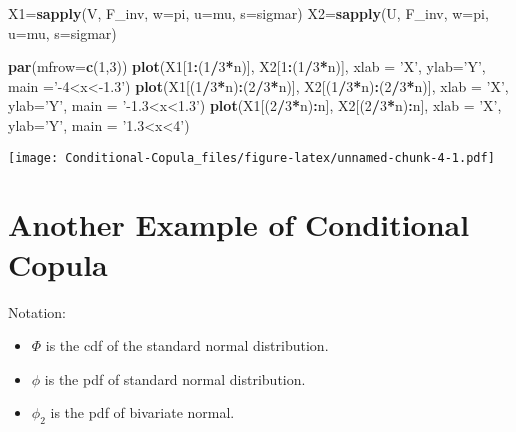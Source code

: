 \documentclass[]{article}
\newenvironment{Shaded}{\begin{snugshade}}{\end{snugshade}}
\newcommand{\KeywordTok}[1]{\textcolor[rgb]{0.13,0.29,0.53}{\textbf{#1}}}
\newcommand{\DataTypeTok}[1]{\textcolor[rgb]{0.13,0.29,0.53}{#1}}
\newcommand{\DecValTok}[1]{\textcolor[rgb]{0.00,0.00,0.81}{#1}}
\newcommand{\StringTok}[1]{\textcolor[rgb]{0.31,0.60,0.02}{#1}}
\newcommand{\OperatorTok}[1]{\textcolor[rgb]{0.81,0.36,0.00}{\textbf{#1}}}
\newcommand{\NormalTok}[1]{#1}
\providecommand{\tightlist}{%
  \setlength{\itemsep}{0pt}\setlength{\parskip}{0pt}}
\begin{document}
\begin{Shaded}
\begin{Highlighting}[]
\NormalTok{X1=}\KeywordTok{sapply}\NormalTok{(V, F_inv, }\DataTypeTok{w=}\NormalTok{pi, }\DataTypeTok{u=}\NormalTok{mu, }\DataTypeTok{s=}\NormalTok{sigmar)}
\NormalTok{X2=}\KeywordTok{sapply}\NormalTok{(U, F_inv, }\DataTypeTok{w=}\NormalTok{pi, }\DataTypeTok{u=}\NormalTok{mu, }\DataTypeTok{s=}\NormalTok{sigmar)}

\KeywordTok{par}\NormalTok{(}\DataTypeTok{mfrow=}\KeywordTok{c}\NormalTok{(}\DecValTok{1}\NormalTok{,}\DecValTok{3}\NormalTok{))}
\KeywordTok{plot}\NormalTok{(X1[}\DecValTok{1}\OperatorTok{:}\NormalTok{(}\DecValTok{1}\OperatorTok{/}\DecValTok{3}\OperatorTok{*}\NormalTok{n)], X2[}\DecValTok{1}\OperatorTok{:}\NormalTok{(}\DecValTok{1}\OperatorTok{/}\DecValTok{3}\OperatorTok{*}\NormalTok{n)],  }\DataTypeTok{xlab =} \StringTok{'X'}\NormalTok{, }\DataTypeTok{ylab=}\StringTok{'Y'}\NormalTok{, }\DataTypeTok{main =}\StringTok{'-4<x<-1.3'}\NormalTok{)}
\KeywordTok{plot}\NormalTok{(X1[(}\DecValTok{1}\OperatorTok{/}\DecValTok{3}\OperatorTok{*}\NormalTok{n)}\OperatorTok{:}\NormalTok{(}\DecValTok{2}\OperatorTok{/}\DecValTok{3}\OperatorTok{*}\NormalTok{n)], X2[(}\DecValTok{1}\OperatorTok{/}\DecValTok{3}\OperatorTok{*}\NormalTok{n)}\OperatorTok{:}\NormalTok{(}\DecValTok{2}\OperatorTok{/}\DecValTok{3}\OperatorTok{*}\NormalTok{n)], }\DataTypeTok{xlab =} \StringTok{'X'}\NormalTok{, }\DataTypeTok{ylab=}\StringTok{'Y'}\NormalTok{, }\DataTypeTok{main =}  \StringTok{'-1.3<x<1.3'}\NormalTok{)}
\KeywordTok{plot}\NormalTok{(X1[(}\DecValTok{2}\OperatorTok{/}\DecValTok{3}\OperatorTok{*}\NormalTok{n)}\OperatorTok{:}\NormalTok{n], X2[(}\DecValTok{2}\OperatorTok{/}\DecValTok{3}\OperatorTok{*}\NormalTok{n)}\OperatorTok{:}\NormalTok{n], }\DataTypeTok{xlab =} \StringTok{'X'}\NormalTok{, }\DataTypeTok{ylab=}\StringTok{'Y'}\NormalTok{, }\DataTypeTok{main =} \StringTok{'1.3<x<4'}\NormalTok{)}
\end{Highlighting}
\end{Shaded}

\texttt{[image: Conditional-Copula\_files/figure-latex/unnamed-chunk-4-1.pdf]}

\section{Another Example of Conditional
Copula}\label{another-example-of-conditional-copula}

Notation:

\begin{itemize}
\tightlist
\item
  \(\Phi\) is the cdf of the standard normal distribution.
\item
  \(\phi\) is the pdf of standard normal distribution.
\item
  \(\phi_2\) is the pdf of bivariate normal.
\end{itemize}
\end{document}
